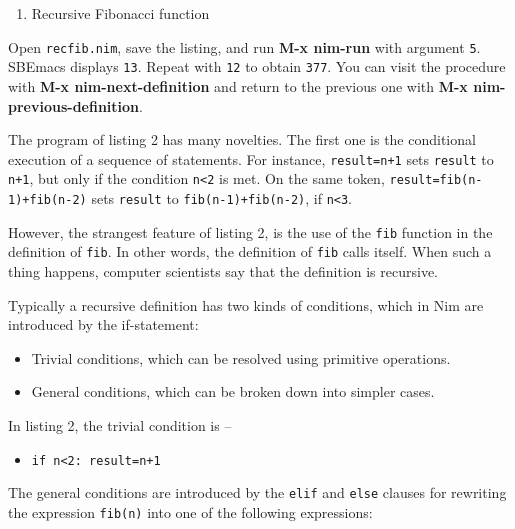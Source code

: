 \documentclass[
  12pt,
]{book}
\providecommand{\tightlist}{%
  \setlength{\itemsep}{0pt}\setlength{\parskip}{0pt}}
\begin{document}
\begin{enumerate}
\def\labelenumi{(\arabic{enumi})}
\setcounter{enumi}{1}
\tightlist
\item
  Recursive Fibonacci function
\end{enumerate}

Open \texttt{recfib.nim}, save the listing, and run \textbf{M-x nim-run}
with argument \texttt{5}. SBEmacs displays \texttt{13}. Repeat with
\texttt{12} to obtain \texttt{377}. You can visit the procedure with
\textbf{M-x nim-next-definition} and return to the previous one with
\textbf{M-x nim-previous-definition}.

The program of listing 2 has many novelties. The first one is the
conditional execution of a sequence of statements. For instance,
\texttt{result=n+1} sets \texttt{result} to \texttt{n+1}, but only if
the condition \texttt{n\textless{}2} is met. On the same token,
\texttt{result=fib(n-1)+fib(n-2)} sets \texttt{result} to
\texttt{fib(n-1)+fib(n-2)}, if \texttt{n\textless{}3}.

However, the strangest feature of listing 2, is the use of the
\texttt{fib} function in the definition of \texttt{fib}. In other words,
the definition of \texttt{fib} calls itself. When such a thing happens,
computer scientists say that the definition is recursive.

Typically a recursive definition has two kinds of conditions, which in
Nim are introduced by the if-statement:

\begin{itemize}
\tightlist
\item
  Trivial conditions, which can be resolved using primitive operations.
\item
  General conditions, which can be broken down into simpler cases.
\end{itemize}

In listing 2, the trivial condition is --

\begin{itemize}
\tightlist
\item
  \texttt{if\ n\textless{}2:\ result=n+1}
\end{itemize}

The general conditions are introduced by the \texttt{elif} and
\texttt{else} clauses for rewriting the expression \texttt{fib(n)} into
one of the following expressions:
\end{document}
